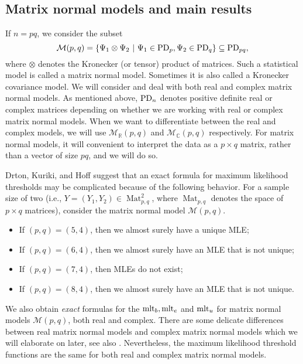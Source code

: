 \documentclass[11pt]{amsart}
\theoremstyle{definition}
\newcommand{\R}{{\mathbb R}}
\newcommand{\PD} {{\rm PD}}
\newcommand{\mlt}{{\rm mlt}}
\newcommand{\C}{{\mathbb C}}
\newcommand{\Mat}{\operatorname{Mat}}
\begin{document}
\subsection{Matrix normal models and main results} \label{sec:intro-mnm}
If $n = pq$, we consider the subset 
$$
\mathcal{M}(p,q) = \{\Psi_1 \otimes \Psi_2\ |\ \Psi_1 \in \PD_p, \Psi_2 \in \PD_q\} \subseteq \PD_{pq},
$$ 
where $\otimes$ denotes the Kronecker (or tensor) product of matrices. Such a statistical model is called a matrix normal model. Sometimes it is also called a Kronecker covariance model. We will consider and deal with both real and complex matrix normal models. As mentioned above, $\PD_n$ denotes positive definite real or complex matrices depending on whether we are working with real or complex matrix normal models. When we want to differentiate between the real and complex models, we will use $\mathcal{M}_\R(p,q)$ and $\mathcal{M}_\C(p,q)$ respectively. For matrix normal models, it will convenient to interpret the data as a $p \times q$ matrix, rather than a vector of size $pq$, and we will do so.

Drton, Kuriki, and Hoff \cite{Drton-etal} suggest that an exact formula for maximum likelihood thresholds may be complicated because of the following behavior. For a sample size of two (i.e., $Y = (Y_1,Y_2) \in \Mat_{p,q}^2$, where $\Mat_{p,q}$ denotes the space of $p \times q$ matrices), consider the matrix normal model $\mathcal{M}(p,q)$.

\begin{itemize}
\item If $(p,q) = (5,4)$, then we almost surely have a unique MLE;
\item If $(p,q) = (6,4)$, then we almost surely have an MLE that is not unique;
\item If $(p,q) = (7,4)$, then MLEs do not exist;
\item If $(p,q) = (8,4)$, then we almost surely have an MLE that is not unique.
\end{itemize}



We also obtain {\em exact} formulas for the $\mlt_b,\mlt_e$ and $\mlt_u$ for matrix normal models $\mathcal{M}(p,q)$, both real and complex. There are some delicate differences between real matrix normal models and complex matrix normal models which we will elaborate on later, see also \cite[Example~5.6]{AKRS}. Nevertheless, the maximum likelihood threshold functions are the same for both real and complex matrix normal models.
\end{document}
